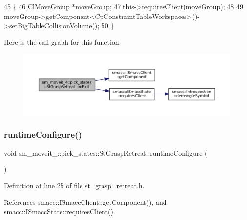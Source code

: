 \begin{DoxyCode}
45     \{
46         ClMoveGroup *moveGroup;
47         this->\hyperlink{classsmacc_1_1ISmaccState_a7f95c9f0a6ea2d6f18d1aec0519de4ac}{requiresClient}(moveGroup);
48         
49         moveGroup->getComponent<CpConstraintTableWorkspaces>()->setBigTableCollisionVolume();
50     \}
\end{DoxyCode}
Here is the call graph for this function\+:
\nopagebreak
\begin{figure}[H]
\begin{center}
\leavevmode
\includegraphics[width=350pt]{structsm__moveit__4_1_1pick__states_1_1StGraspRetreat_aba04f694c6c7c664a0c6a6e10c8ce0f1_cgraph}
\end{center}
\end{figure}
\mbox{\label{structsm__moveit__4_1_1pick__states_1_1StGraspRetreat_a2d386f511e377a4b0eb8193cd24ddb84}} 
\subsubsection{\texorpdfstring{runtime\+Configure()}{runtimeConfigure()}}
{\footnotesize\ttfamily void sm\+\_\+moveit\+\_\+::pick\+\_\+states\+::\+St\+Grasp\+Retreat\+::runtime\+Configure (\begin{DoxyParamCaption}{ }\end{DoxyParamCaption})\hspace{0.3cm}{\ttfamily [inline]}}



Definition at line 25 of file st\+\_\+grasp\+\_\+retreat.\+h.



References smacc\+::\+I\+Smacc\+Client\+::get\+Component(), and smacc\+::\+I\+Smacc\+State\+::requires\+Client().


